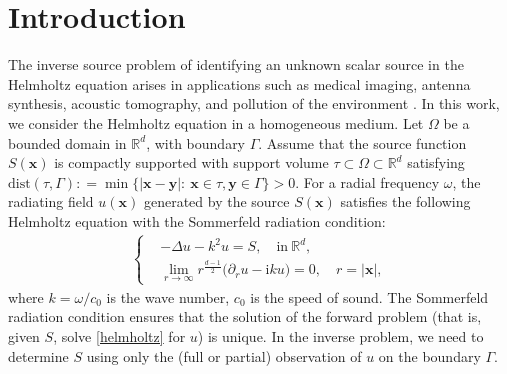 \documentclass{article}
\theoremstyle{plain}
\theoremstyle{definition}
\begin{document}
\section{Introduction}
The inverse source problem of identifying an unknown scalar source in the Helmholtz equation arises in applications such as medical imaging,  antenna synthesis, acoustic tomography, and pollution of the environment \cite{albanese2006medical1,arridge1999medical2,fokas2004medical3,anastasio2007application,devaney2007inverse,ramm1999multidimensional,stefanov2009thermoacoustic,bojarski1973inverse,lin2011helmholtz}.
In this work,  we consider the Helmholtz equation in a homogeneous medium. Let $\Omega$ be a bounded domain in $\mathbb{R}^d$,  with boundary $\Gamma$.  {Assume that the source function $S(\boldsymbol{x})$ is compactly supported with support volume $\tau \subset  \Omega \subset \mathbb{R}^d$ satisfying $\mathrm{dist}(\tau, \Gamma): =\operatorname*{min}\{|\boldsymbol{x}-\boldsymbol{y}|{: } \ \boldsymbol{x}\in\tau, \boldsymbol{y}\in\Gamma\}>0$}. For a radial frequency $\omega$,  the radiating field $u(\boldsymbol{x})$ generated by the source $S(\boldsymbol{x})$  satisfies the following Helmholtz equation with the Sommerfeld radiation condition:
\begin{align}\label{helmholtz}
\left \{
\begin{aligned}
&-\Delta u-k^2u=S,  \quad \text{in} \  \mathbb{R}^d, \\
&\lim_{r\to\infty}r^{\frac{d-1}{2}}\bigl({\partial_r u} -\mathrm{i}ku\bigr)=0, \quad r=|\boldsymbol{x}|, 
\end{aligned}
\right.
\end{align}
where $k={\omega}/{c_0}$ is the wave number,  $c_0$ is the speed of sound.  The Sommerfeld radiation condition ensures that the solution of the forward problem (that is, given $S$, solve \eqref{helmholtz} for $u$) is unique. In the inverse problem, we need to determine $S$ using only the (full or partial) observation of $u$ on the boundary $\Gamma$. 
\end{document}
